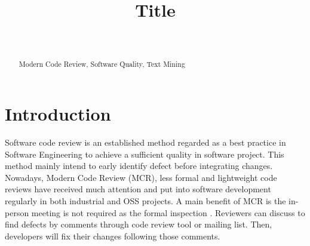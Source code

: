 \documentclass[conference]{IEEEtran}
\begin{document}
\title{Title}

\author{
\\


}


\maketitle
{}
{\newcommand{\nbnote}[2]{
  \fcolorbox{blue}{yellow}{\bfseries\sffamily\scriptsize#1}
  {\sf\small\textit{#2}}
 }
}
{\newcommand{\nbnote}[2]{}
 \newcommand{\version}{}
}
\newcommand\pick[1]{\nbnote{Pick sez}{\textcolor{magenta}{#1}}}
\newcommand\thai[1]{\nbnote{Thai sez}{\textcolor{blue}{#1}}}


\begin{abstract}




\begin{IEEEkeywords}
Modern Code Review, Software Quality, Text Mining
\end{IEEEkeywords}
\end{abstract}

\section{Introduction}
Software code review is an established method regarded as a best practice in Software Engineering to achieve a sufficient quality in software project. This method mainly intend to early identify defect before integrating changes. Nowadays, Modern Code Review (MCR)\cite{Bacchelli2013a}, less formal and lightweight code reviews have received much attention and  put into software development regularly in both industrial and OSS projects. A main benefit of MCR is the in-person meeting is not required as the formal inspection \cite{Fagan:1976:DCI:1661010.1661012}. Reviewers can discuss to find defects by comments through code review tool or mailing list. Then, developers will fix their changes following those comments.
\end{document}

